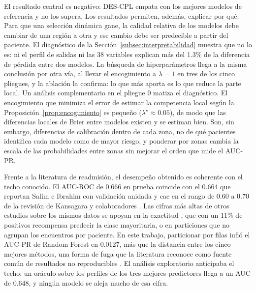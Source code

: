 \documentclass[pdflatex,sn-mathphys-num]{sn-jnl}
\theoremstyle{plain}
\begin{document}
El resultado central es negativo: DES-CPL empata con los mejores modelos de referencia y no los supera. Los resultados permiten, además, explicar por qué. Para que una selección dinámica gane, la calidad relativa de los modelos debe cambiar de una región a otra y ese cambio debe ser predecible a partir del paciente. El diagnóstico de la Sección~\ref{subsec:interpretabilidad} muestra que no lo es: ni el perfil de salidas ni las 38 variables explican más del 1.3\% de la diferencia de pérdida entre dos modelos. La búsqueda de hiperparámetros llega a la misma conclusión por otra vía, al llevar el encogimiento a $\lambda=1$ en tres de los cinco pliegues, y la ablación la confirma: lo que más aporta es lo que reduce la parte local. Un análisis complementario en el pliegue 0 matiza el diagnóstico. El encogimiento que minimiza el error de estimar la competencia local según la Proposición~\ref{prop:encogimiento} es pequeño ($\lambda^\star\approx0.05$), de modo que las diferencias locales de Brier entre modelos existen y se estiman bien. Son, sin embargo, diferencias de calibración dentro de cada zona, no de qué pacientes identifica cada modelo como de mayor riesgo, y ponderar por zonas cambia la escala de las probabilidades entre zonas sin mejorar el orden que mide el AUC-PR.

Frente a la literatura de readmisión, el desempeño obtenido es coherente con el techo conocido. El AUC-ROC de 0.666 en prueba coincide con el 0.664 que reportan Salim e Ibrahim con validación anidada \cite{bib_salim_2026} y cae en el rango de 0.60 a 0.70 de la revisión de Kansagara y colaboradores \cite{bib_kansagara}. Las cifras más altas de otros estudios sobre los mismos datos se apoyan en la exactitud \cite{bib_neto_2021}, que con un 11\% de positivos recompensa predecir la clase mayoritaria, o en particiones que no agrupan los encuentros por paciente. En este trabajo, particionar por filas infló el AUC-PR de Random Forest en 0.0127, más que la distancia entre los cinco mejores métodos, una forma de fuga que la literatura reconoce como fuente común de resultados no reproducibles \cite{bib_kapoor_2023}. El análisis exploratorio anticipaba el techo: un oráculo sobre los perfiles de los tres mejores predictores llega a un AUC de 0.648, y ningún modelo se aleja mucho de esa cifra.
\end{document}
